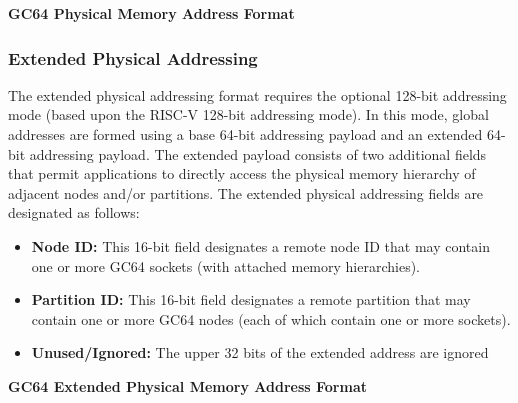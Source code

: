 \documentclass{article}
\begin{document}
\begin{center}
\textbf{GC64 Physical Memory Address Format}
\makebox[0.03in][s]{}\makebox[0.03in][s]{}\makebox[0.03in][s]{}
\end{center}

\subsubsection{Extended Physical Addressing}

The extended physical addressing format requires the optional 128-bit addressing
mode (based upon the RISC-V 128-bit addressing mode).  In this mode, global 
addresses are formed using a base 64-bit addressing payload and an extended
64-bit addressing payload.  The extended payload consists of two additional
fields that permit applications to directly access the physical memory hierarchy
of adjacent nodes and/or partitions.  The extended physical addressing fields
are designated as follows: 

\begin{itemize}
\item \textbf{Node ID:} This 16-bit field designates a remote node ID that 
may contain one or more GC64 sockets (with attached memory hierarchies).  
\item \textbf{Partition ID:} This 16-bit field designates a remote partition
that may contain one or more GC64 nodes (each of which contain one or more 
sockets).
\item \textbf{Unused/Ignored:} The upper 32 bits of the extended address are ignored
\end{itemize} 

\begin{center}
\textbf{GC64 Extended Physical Memory Address Format}
\makebox[0.03in][s]{}\makebox[0.03in][s]{}
\makebox[0.03in][s]{}\makebox[0.03in][s]{}\makebox[0.03in][s]{}
\end{center}
\end{document}
